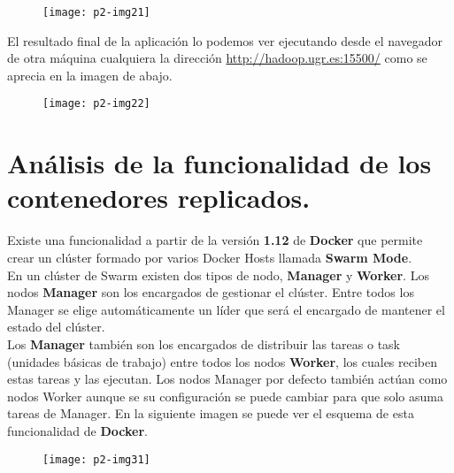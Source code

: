 \documentclass[10pt]{article}
\begin{document}
 \begin{figure}[H]
	\begin{center}
 		\texttt{[image: p2-img21]}
	\end{center} 
\end{figure} 


El resultado final de la aplicación lo podemos ver ejecutando desde el navegador de otra máquina cualquiera la dirección \url{http://hadoop.ugr.es:15500/} como se aprecia en la imagen de abajo.\\

 \begin{figure}[H]
	\begin{center}
 		\texttt{[image: p2-img22]}
	\end{center} 
\end{figure}


\section{Análisis de la funcionalidad de los contenedores replicados.} 
Existe una funcionalidad a partir de la versión \textbf{1.12} de \textbf{Docker} que permite crear un clúster formado por varios Docker Hosts llamada \textbf{Swarm Mode}. \\

En un clúster de Swarm existen dos tipos de nodo, \textbf{Manager} y \textbf{Worker}. Los nodos \textbf{Manager} son los encargados de gestionar el clúster. Entre todos los Manager se elige automáticamente un líder que será el encargado de mantener el estado del clúster.\\

Los \textbf{Manager} también son los encargados de distribuir las tareas o task (unidades básicas de trabajo) entre todos los nodos \textbf{Worker}, los cuales reciben estas tareas y las ejecutan. Los nodos Manager por defecto también actúan como nodos Worker aunque se su configuración se puede cambiar para que solo asuma tareas de Manager. En la siguiente imagen se puede ver el esquema de esta funcionalidad de \textbf{Docker}.\\

 \begin{figure}[H]
	\begin{center}
 		\texttt{[image: p2-img31]}
	\end{center} 
\end{figure}
\end{document}
